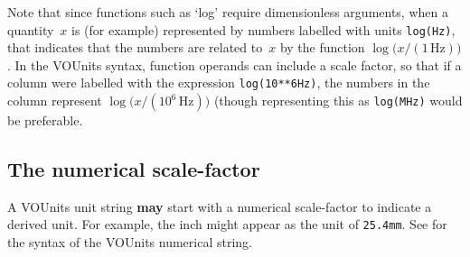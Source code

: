 \documentclass[11pt,a4paper]{ivoa}
\newcommand{\unit}[1]{\texttt{\small\color{orange}#1}}
\newcommand*\norm[1]{\textbf{\color{ivoacolor}#1}}
\def\eg{e.g.,~}
\begin{document}
Note that since functions such as `log' require dimensionless
arguments, when a quantity~$x$ is (for example) represented by numbers
labelled with units \unit{log(Hz)}, that indicates that the numbers
are related to~$x$ by the function
$\log\bigl(x/(\mathrm{1\,Hz})\bigr)$.  In the VOUnits syntax, function
operands can include a scale factor, so that if a column were
labelled with the expression \unit{log(10**6Hz)}, the numbers in the
column represent $\log\bigl(x/(\mathrm{10^6\,Hz})\bigr)$ (though
representing this as \unit{log(MHz)} would be preferable.

%
%
%
%

\subsection{The numerical scale-factor}
\label{sec:scalefactor}

A VOUnits unit string \norm{may} start with a numerical scale-factor
to indicate a derived unit.  For example, the inch might appear as the
unit of \unit{25.4mm}.  See  for the syntax
of the VOUnits numerical string.
\end{document}

